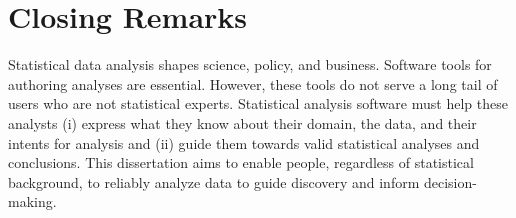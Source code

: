 \begin{comment}
To more systematically capture and act on these kinds of anecdotes in the
future, I am excited to develop a web platform for \tea and \tisane, where users
can share their programs, data, and insights. Over time, I hope to collect a
gallery of examples to answer questions about challenges using the DSLs, the
learn which use cases are under-supported, and assess the practical impact of
using conceptual abstractions and automated reasoning. I would also like to see
if end-users repeatedly use \tea and \tisane or if these are one-off
engagements. I look forward to not only pursuing ideas and systems developed in
this dissertation but also fostering a community of users. 
\end{comment}

\section{Closing Remarks}
Statistical data analysis shapes science, policy, and business. Software tools
for authoring analyses are essential. However, these tools do not serve a long
tail of users who are not statistical experts. Statistical analysis software
must help these analysts (i) express what they know about their domain, the
data, and their intents for analysis and (ii) guide them towards valid
statistical analyses and conclusions. This dissertation aims to enable people,
regardless of statistical background, to reliably analyze data to guide discovery
and inform decision-making. 